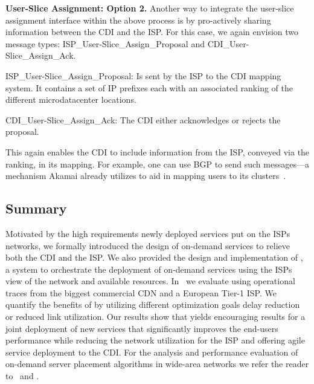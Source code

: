 {\bf User-Slice Assignment: Option 2.}
Another way to integrate the user-slice assignment interface within
the above process is by pro-actively sharing information between the CDI
and the ISP.  For this case, we again envision two message types:
ISP\_User-Slice\_Assign\_Pro\-po\-sal and CDI\_User-Slice\_Assign\_Ack.

\begin{description*}

\item [ISP\_User-Slice\_Assign\_Proposal:] Is sent by the ISP to the CDI
  mapping system. It contains a set of IP prefixes each with an associated
  ranking of the different microdatacenter locations.

\item [CDI\_User-Slice\_Assign\_Ack:] The CDI either acknowledges or rejects
  the proposal.

\end{description*}

This again enables the CDI to include information from the ISP, conveyed via
the ranking, in its mapping.  For example, one can use BGP to send such
messages---a mechanism Akamai already utilizes to aid in mapping users to
its clusters~\cite{Akamai-Network}.


\subsection{Summary}

Motivated by the high requirements newly deployed services put on the ISPs
networks, we formally introduced the design of on-demand services to relieve
both the CDI and the ISP.  We also provided the design and implementation of
\Netpaas, a system to orchestrate the deployment of on-demand services using
the ISPs view of the network and available resources. In~\cite{NetPaaS} we
evaluate \Netpaas using operational traces from the biggest commercial CDN and
a European Tier-1 ISP. We quantify the benefits of \Netpaas by utilizing
different optimization goals \eg delay reduction or reduced link utilization.
Our results show that \Netpaas yields encouraging results for a joint
deployment of new services that significantly improves the end-users
performance while reducing the network utilization for the ISP and offering
agile service deployment to the CDI. For the analysis and performance evaluation of
on-demand server placement algorithms in wide-area networks we refer the reader
to~\cite{ToN-dFL} and \cite{SimultaneousSourceLocation}.

